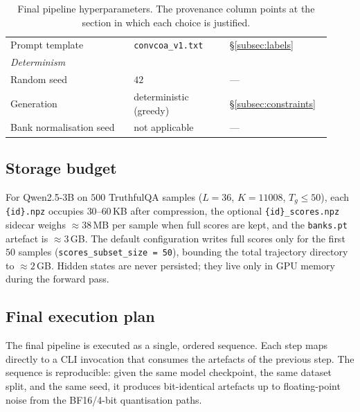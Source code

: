 \begin{table}[H]
\begin{tabular}{p{0.36\linewidth} p{0.28\linewidth} p{0.28\linewidth}}
        \hspace{1em}Prompt template              & \texttt{convcoa\_v1.txt}    & §\ref{subsec:labels} \\
        \multicolumn{3}{l}{\emph{Determinism}} \\
        \hspace{1em}Random seed                  & $42$                       & — \\
        \hspace{1em}Generation                   & deterministic (greedy)      & §\ref{subsec:constraints} \\
        \hspace{1em}Bank normalisation seed      & not applicable             & — \\
        \bottomrule
    \end{tabular}
    \caption{Final pipeline hyperparameters. The provenance column points
    at the section in which each choice is justified.}
    \label{tab:hyperparameters}
\end{table}

\subsection{Storage budget}
\label{subsec:storage}

For Qwen2.5-3B on $500$ TruthfulQA samples ($L=36$, $K=11008$,
$T_g \le 50$), each \texttt{\{id\}.npz} occupies $30$–$60$\,KB after
compression, the optional \texttt{\{id\}\_scores.npz} sidecar weighs
$\approx 38$\,MB per sample when full scores are kept, and the
\texttt{banks.pt} artefact is $\approx 3$\,GB. The default
configuration writes full scores only for the first $50$ samples
(\texttt{scores\_subset\_size = 50}), bounding the total trajectory
directory to $\approx 2$\,GB. Hidden states are never persisted; they
live only in GPU memory during the forward pass.

\subsection{Final execution plan}
\label{subsec:execution_plan}

The final pipeline is executed as a single, ordered sequence. Each step
maps directly to a CLI invocation that consumes the artefacts of the
previous step. The sequence is reproducible: given the same model
checkpoint, the same dataset split, and the same seed, it produces
bit-identical artefacts up to floating-point noise from the BF16/4-bit
quantisation paths.

